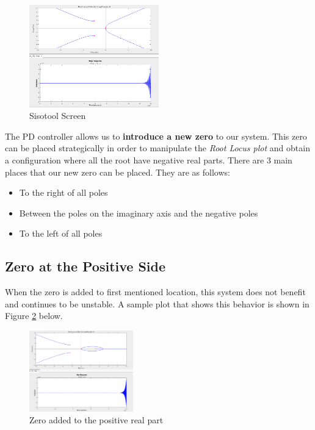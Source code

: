 \begin{figure}[H]
    \centering
    \includegraphics[width=0.5\textwidth]{images/siso1.png}
    \caption{Sisotool Screen}
    \label{fig:siso1}
\end{figure}


The PD controller allows us to \textbf{introduce a new zero} to our system. This zero can be placed strategically in order to manipulate the \textit{Root Locus plot} and obtain a configuration where all the root have negative real parts. There are 3 main places that our new zero can be placed. They are as follows:



\begin{itemize}
    \item To the right of all poles
    \item Between the poles on the imaginary axis and the negative poles
    \item To the left of all poles
    
\end{itemize}

\subsection{Zero at the Positive Side}
When the zero is added to first mentioned location, this system does not benefit and continues to be unstable. A sample plot that shows this behavior is shown in Figure \ref{fig:zeroright} below.

\begin{figure}[H]
    \centering
    \includegraphics[width=0.4\textwidth]{images/zero_positive.png}
    \caption{Zero added to the positive real part}
    \label{fig:zeroright}
\end{figure}


